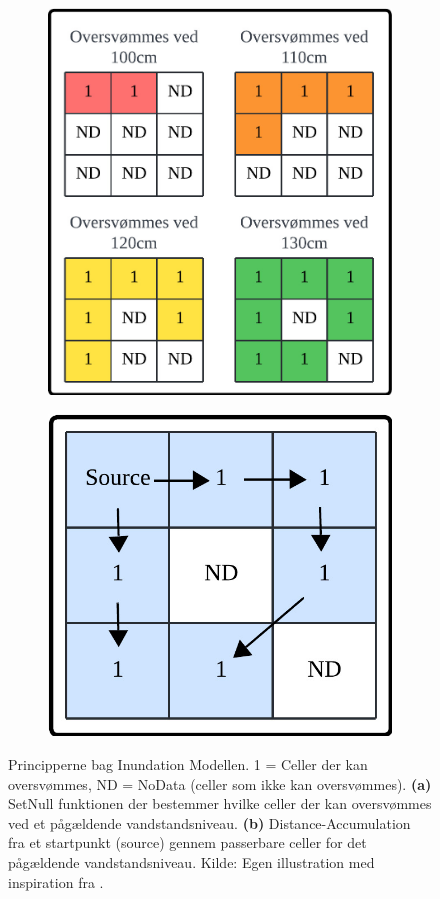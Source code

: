 \begin{figure}[H]
    \begin{subfigure}[t]{0.5\textwidth}
        \centering
        \includegraphics[width=0.7\linewidth]{images/teori/inundated_cells.jpeg}
        \caption{}
        \label{Subfig: Celler Inundated}
    \end{subfigure}
    \begin{subfigure}[t]{0.5\textwidth}
        \centering
        \includegraphics[width=0.85\linewidth]{images/teori/distance_accumulation.jpeg}
        \caption{}
        \label{Subfig: DA}
    \end{subfigure}
    \caption{Principperne bag Inundation Modellen. 1 = Celler der kan oversvømmes, ND = NoData (celler som ikke kan oversvømmes). \textbf{(a)} SetNull funktionen der bestemmer hvilke celler der kan oversvømmes ved et pågældende vandstandsniveau. \textbf{(b)} Distance-Accumulation fra et startpunkt (source) gennem passerbare celler for det pågældende vandstandsniveau. Kilde: Egen illustration med inspiration fra \cite{balstrom_kirby_inundation}.}
    \label{Figur: }
\end{figure}
